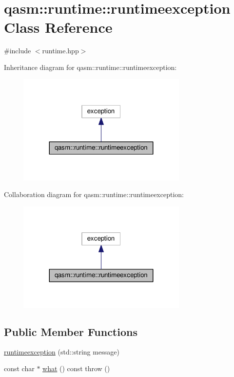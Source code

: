 \hypertarget{classqasm_1_1runtime_1_1runtimeexception}{}\section{qasm\+:\+:runtime\+:\+:runtimeexception Class Reference}
\label{classqasm_1_1runtime_1_1runtimeexception}


{\ttfamily \#include $<$runtime.\+hpp$>$}



Inheritance diagram for qasm\+:\+:runtime\+:\+:runtimeexception\+:\nopagebreak
\begin{figure}[H]
\begin{center}
\leavevmode
\includegraphics[width=239pt]{classqasm_1_1runtime_1_1runtimeexception__inherit__graph}
\end{center}
\end{figure}


Collaboration diagram for qasm\+:\+:runtime\+:\+:runtimeexception\+:\nopagebreak
\begin{figure}[H]
\begin{center}
\leavevmode
\includegraphics[width=239pt]{classqasm_1_1runtime_1_1runtimeexception__coll__graph}
\end{center}
\end{figure}
\subsection*{Public Member Functions}
\begin{DoxyCompactItemize}
\item 
\hyperlink{classqasm_1_1runtime_1_1runtimeexception_a441e42301526a93e37ceb3f6eb0cc988}{runtimeexception} (std\+::string message)
\item 
const char $\ast$ \hyperlink{classqasm_1_1runtime_1_1runtimeexception_a574525d5f4cac73500dd11215bbb14a3}{what} () const   throw ()
\end{DoxyCompactItemize}
